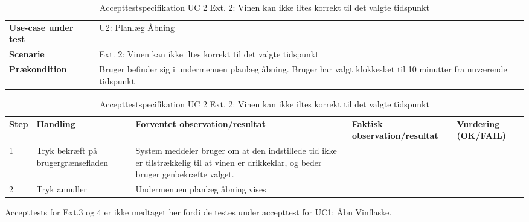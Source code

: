 \begin{table}[H]
	\centering
	\caption{Accepttestspecifikation UC 2 Ext. 2: Vinen kan ikke iltes korrekt til det valgte tidspunkt}
	\label{ATUC2:Ext2}
	\begin{tabular}{ p{80pt}  p{320pt} }\hline
		\rowcolor{lightgray}	
		\textbf{Use-case under test} & U2: Planlæg Åbning \\
		\rowcolor{white}
		\textbf{Scenarie} & Ext. 2: Vinen kan ikke iltes korrekt til det valgte tidspunkt \\\rowcolor{lightgray}	
		\textbf{Prækondition} &
		Bruger befinder sig i undermenuen planlæg åbning. Bruger har valgt klokkeslæt til 10 minutter fra nuværende tidspunkt \\
		\hline
	\end{tabular}
	\begin{tabular}{  p{26pt} p{100pt}  p{101pt} | p{67pt} | p{68pt}}
		\textbf{Step} & \textbf{Handling} & \textbf{Forventet observation/resultat} & \textbf{Faktisk observation/resultat} & \textbf{Vurdering (OK/FAIL)}\\
		1 & Tryk bekræft på brugergrænsefladen & System meddeler bruger om at den indstillede tid ikke er tilstrækkelig til at vinen er drikkeklar, og beder bruger genbekræfte valget.
 &  &  \\
 		2 & Tryk annuller & Undermenuen planlæg åbning vises\\
		\hline
	\end{tabular}
\end{table}

Accepttests for Ext.3 og 4 er ikke medtaget her fordi de testes under accepttest for UC1: Åbn Vinflaske.

